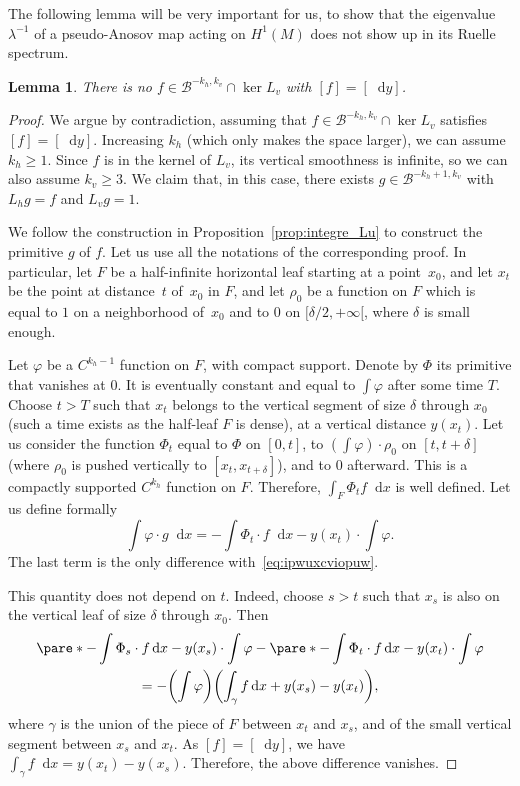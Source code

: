 \documentclass[JEP,XML,SOM,Unicode]{cedram}
\newcommand{\boB}{\mathcal{B}}
\newcommand{\dd}{\mathop{}\!\mathrm{d}}
\newcommand{\paregg}[1]{\biggl(#1\biggr)}
\let\phi\varphi
\newtheorem{lem}[thm]{Lemma}
\theoremstyle{definition}
\numberwithin{equation}{section}
\begin{document}
The following lemma will be very important for us, to show that the
eigenvalue $\lambda^{-1}$ of a pseudo-Anosov map acting on $H^1(M)$ does not
show up in its Ruelle spectrum.

\begin{lem}
\label{lem:Lv_preimage_1} There is no $f \in \boB^{-k_h, k_v} \cap \ker L_v$
with $[f] = [\dd y]$.
\end{lem}
\begin{proof}
We argue by contradiction, assuming that $f \in \boB^{-k_h, k_v} \cap \ker
L_v$ satisfies $[f] = [\dd y]$. Increasing $k_h$ (which only makes the space
larger), we can assume $k_h \geq 1$. Since $f$ is in the kernel of $L_v$, its
vertical smoothness is infinite, so we can also assume $k_v\geq 3$. We claim
that, in this case, there exists $g \in \boB^{-k_h+1, k_v}$ with $L_h g = f$
and $L_v g = 1$.

We follow the construction in Proposition~\ref{prop:integre_Lu} to construct
the primitive $g$ of $f$. Let us use all the notations of the corresponding
proof. In particular, let $F$ be a half-infinite horizontal leaf starting at
a point~$x_0$, and let $x_t$ be the point at distance~$t$ of~$x_0$ in $F$,
and let $\rho_0$ be a function on $F$ which is equal to $1$ on a neighborhood
of~$x_0$ and to $0$ on $[\delta/2, +\infty[$, where $\delta$ is small enough.

Let $\phi$ be a $C^{k_h-1}$ function on $F$, with compact support. Denote by
$\Phi$ its primitive that vanishes at $0$. It is eventually constant and
equal to $\int \phi$ after some time $T$. Choose $t>T$ such that $x_t$
belongs to the vertical segment of size $\delta$ through $x_0$ (such a time
exists as the half-leaf $F$ is dense), at a vertical distance $y(x_t)$. Let
us consider the function $\Phi_t$ equal to $\Phi$ on $[0,t]$, to $(\int \phi)
\cdot \rho_0$ on $[t, t+\delta]$ (where $\rho_0$ is pushed vertically to
$[x_t, x_{t+\delta}]$), and to $0$ afterward. This is a compactly supported
$C^{k_h}$ function on $F$. Therefore, $\int_F \Phi_t f \dd x$ is well
defined. Let us define formally\vspace*{-3pt}
\begin{equation}
\label{eq:puiowxuiopv}
\int \phi\cdot g \dd x = -\int \Phi_t \cdot f \dd x - y(x_t) \cdot \int \phi.
\end{equation}
The last term is the only difference with~\eqref{eq:ipwuxcviopuw}.

This quantity does not depend on $t$. Indeed, choose $s>t$ such that $x_s$ is
also on the vertical leaf of size $\delta$ through $x_0$. Then\vspace*{-3pt}
\begin{multline*}
\pare*{-\int \Phi_s \cdot f \dd x - y(x_s) \cdot \int \phi} - \pare*{-\int \Phi_t \cdot f \dd x - y(x_t) \cdot \int \phi}
\\ = -\paregg{\int \phi} \paregg{\int_\gamma f \dd x + y(x_s) - y(x_t)},
\end{multline*}
where $\gamma$ is the union of the piece of $F$ between $x_t$ and $x_s$, and
of the small vertical segment between $x_s$ and $x_t$. As $[f] = [\dd y]$, we
have $\int_\gamma f \dd x = y(x_t) - y(x_s)$. Therefore, the above difference
vanishes.


\end{proof}
\end{document}
